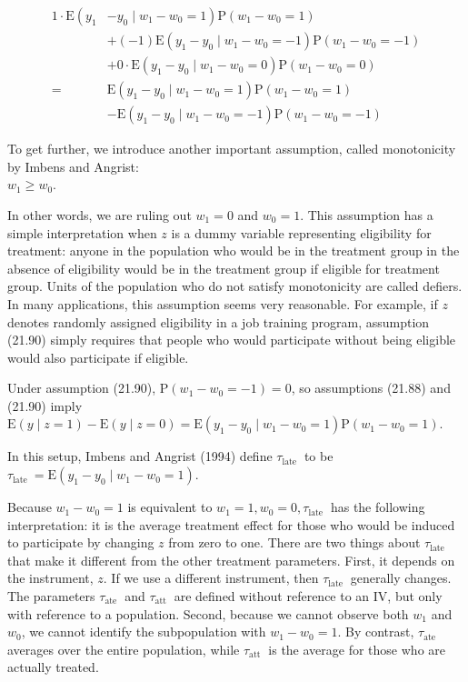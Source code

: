 \documentclass[10pt]{article}
\begin{document}
$$
\begin{aligned}
1 \cdot \mathrm{E}\left(y_{1}\right. & \left.-y_{0} \mid w_{1}-w_{0}=1\right) \mathrm{P}\left(w_{1}-w_{0}=1\right) \\
& +(-1) \mathrm{E}\left(y_{1}-y_{0} \mid w_{1}-w_{0}=-1\right) \mathrm{P}\left(w_{1}-w_{0}=-1\right) \\
& +0 \cdot \mathrm{E}\left(y_{1}-y_{0} \mid w_{1}-w_{0}=0\right) \mathrm{P}\left(w_{1}-w_{0}=0\right) \\
= & \mathrm{E}\left(y_{1}-y_{0} \mid w_{1}-w_{0}=1\right) \mathrm{P}\left(w_{1}-w_{0}=1\right) \\
& -\mathrm{E}\left(y_{1}-y_{0} \mid w_{1}-w_{0}=-1\right) \mathrm{P}\left(w_{1}-w_{0}=-1\right)
\end{aligned}
$$

To get further, we introduce another important assumption, called monotonicity by Imbens and Angrist:\\
$w_{1} \geq w_{0}$.

In other words, we are ruling out $w_{1}=0$ and $w_{0}=1$. This assumption has a simple interpretation when $z$ is a dummy variable representing eligibility for treatment: anyone in the population who would be in the treatment group in the absence of eligibility would be in the treatment group if eligible for treatment group. Units of the population who do not satisfy monotonicity are called defiers. In many applications, this assumption seems very reasonable. For example, if $z$ denotes randomly assigned eligibility in a job training program, assumption (21.90) simply requires that people who would participate without being eligible would also participate if eligible.

Under assumption (21.90), $\mathrm{P}\left(w_{1}-w_{0}=-1\right)=0$, so assumptions (21.88) and (21.90) imply\\
$\mathrm{E}(y \mid z=1)-\mathrm{E}(y \mid z=0)=\mathrm{E}\left(y_{1}-y_{0} \mid w_{1}-w_{0}=1\right) \mathrm{P}\left(w_{1}-w_{0}=1\right)$.

In this setup, Imbens and Angrist (1994) define $\tau_{\text {late }}$ to be\\
$\tau_{\text {late }}=\mathrm{E}\left(y_{1}-y_{0} \mid w_{1}-w_{0}=1\right)$.

Because $w_{1}-w_{0}=1$ is equivalent to $w_{1}=1, w_{0}=0, \tau_{\text {late }}$ has the following interpretation: it is the average treatment effect for those who would be induced to participate by changing $z$ from zero to one. There are two things about $\tau_{\text {late }}$ that make it different from the other treatment parameters. First, it depends on the instrument, $z$. If we use a different instrument, then $\tau_{\text {late }}$ generally changes. The parameters $\tau_{\text {ate }}$ and $\tau_{\text {att }}$ are defined without reference to an IV, but only with reference to a population. Second, because we cannot observe both $w_{1}$ and $w_{0}$, we cannot identify the subpopulation with $w_{1}-w_{0}=1$. By contrast, $\tau_{\text {ate }}$ averages over the entire population, while $\tau_{\text {att }}$ is the average for those who are actually treated.
\end{document}
